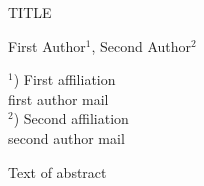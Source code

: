 \documentclass[a4paper]{article}
\begin{document}

\Large
 \begin{center}
TITLE\\ 

\hspace{10pt}

\large
First Author$^1$, Second Author$^2$ \\

\hspace{10pt}

\small  
$^1$) First affiliation\\
first author mail\\
$^2$) Second affiliation\\
second author mail

\end{center}

\hspace{10pt}

\normalsize

Text of abstract
\end{document}
